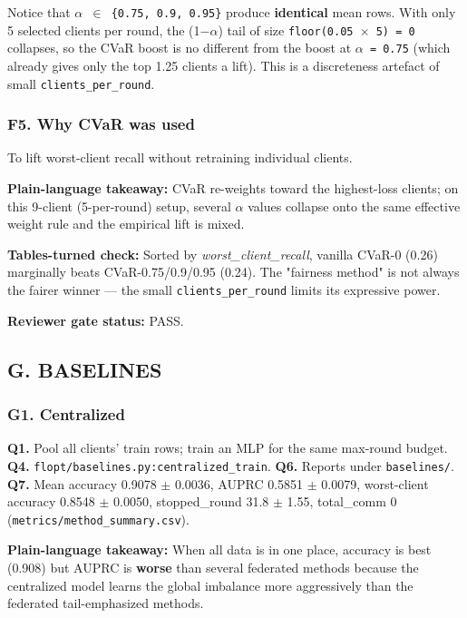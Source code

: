\documentclass{article}
\begin{document}
Notice that \texttt{\ensuremath{\alpha} \ensuremath{\in} \{0.75, 0.9, 0.95\}} produce \textbf{identical} mean rows. With only 5 selected clients per round, the (1\ensuremath{-}\ensuremath{\alpha}) tail of size \texttt{floor(0.05 \ensuremath{\times} 5) = 0} collapses, so the CVaR boost is no different from the boost at \texttt{\ensuremath{\alpha} = 0.75} (which already gives only the top 1.25 clients a lift). This is a discreteness artefact of small \texttt{clients\_per\_round}.


\subsubsection{F5. Why CVaR was used}


To lift worst-client recall without retraining individual clients.


\textbf{Plain-language takeaway:} CVaR re-weights toward the highest-loss clients; on this 9-client (5-per-round) setup, several \ensuremath{\alpha} values collapse onto the same effective weight rule and the empirical lift is mixed.


\textbf{Tables-turned check:} Sorted by \emph{worst\_client\_recall}, vanilla CVaR-0 (0.26) marginally beats CVaR-0.75/0.9/0.95 (0.24). The "fairness method" is not always the fairer winner --- the small \texttt{clients\_per\_round} limits its expressive power.


\textbf{Reviewer gate status:} PASS.


\subsection{G. BASELINES}


\subsubsection{G1. Centralized}


\textbf{Q1.} Pool all clients' train rows; train an MLP for the same max-round budget. \textbf{Q4.} \texttt{flopt/baselines.py:centralized\_train}. \textbf{Q6.} Reports under \texttt{baselines/}. \textbf{Q7.} Mean accuracy 0.9078 \ensuremath{\pm} 0.0036, AUPRC 0.5851 \ensuremath{\pm} 0.0079, worst-client accuracy 0.8548 \ensuremath{\pm} 0.0050, stopped\_round 31.8 \ensuremath{\pm} 1.55, total\_comm 0 (\texttt{metrics/method\_summary.csv}).


\textbf{Plain-language takeaway:} When all data is in one place, accuracy is best (0.908) but AUPRC is \textbf{worse} than several federated methods because the centralized model learns the global imbalance more aggressively than the federated tail-emphasized methods.
\end{document}
